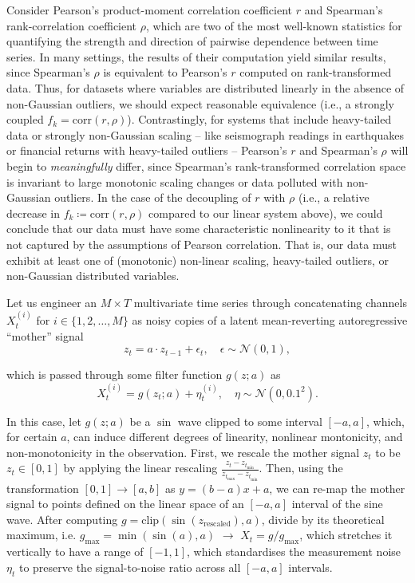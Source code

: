 \documentclass{article}
\theoremstyle{plain}
\theoremstyle{definition}
\theoremstyle{remark}
\begin{document}
Consider Pearson’s product-moment correlation coefficient $r$ and Spearman's rank-correlation coefficient $\rho$, which are two of the most well-known statistics for quantifying the strength and direction of pairwise dependence between time series. In many settings, the results of their computation yield similar results, since Spearman's $\rho$ is equivalent to Pearson’s $r$ computed on rank-transformed data. Thus, for datasets where variables are distributed linearly in the absence of non-Gaussian outliers, we should expect reasonable equivalence (i.e., a strongly coupled $f_k = \mathrm{corr}(r, \rho)$). Contrastingly, for systems that include heavy-tailed data or strongly non-Gaussian scaling -- like seismograph readings in earthquakes or financial returns with heavy-tailed outliers -- Pearson’s $r$ and Spearman’s $\rho$ will begin to \textit{meaningfully} differ, since Spearman’s rank-transformed correlation space is invariant to large monotonic scaling changes or data polluted with non-Gaussian outliers. In the case of the decoupling of $r$ with $\rho$ (i.e., a relative decrease in $f_k \coloneqq \mathrm{corr}(r, \rho)$ compared to our linear system above), we could conclude that our data must have some characteristic nonlinearity to it that is not captured by the assumptions of Pearson correlation. That is, our data must exhibit at least one of (monotonic) non-linear scaling, heavy-tailed outliers, or non-Gaussian distributed variables.

Let us engineer an $M \times T$ multivariate time series through concatenating channels $X_t^{(i)}$ for $i \in \{1,2,\dots,M\}$ as noisy copies of a latent mean-reverting autoregressive “mother” signal
\begin{equation*}
   z_t = a \cdot z_{t-1} + \epsilon_t, \quad \epsilon \sim \mathcal{N}(0,1),
\end{equation*} 

which is passed through some filter function $g(z;a)$ as
\begin{equation*}
    X_t^{(i)} = g(z_t;a) + \eta_t^{(i)}, \quad \eta \sim \mathcal{N}(0,0.1^2).
\end{equation*} 

In this case, let $g(z;a)$ be a $\sin$ wave clipped to some interval $[-a,a]$, which, for certain $a$, can induce different degrees of linearity, nonlinear montonicity, and non-monotonicity in the observation. First, we rescale the mother signal $z_t$ to be $z_t \in [0,1]$ by applying the linear rescaling $\frac{z_t - z_{t_{\min}}}{z_{t_{\max}} - z_{t_{\min}}}$. Then, using the transformation $[0,1] \to [a,b]$ as $y = (b-a)x + a$, we can re-map the mother signal to points defined on the linear space of an $[-a,a]$ interval of the sine wave. After computing $g = \mathrm{clip}(\sin(z_{\mathrm{rescaled}}), a)$, divide by its theoretical maximum, i.e. $g_{\max} = \min(\sin(a), a)$ $\to$ $X_t = g/g_{\max}$, which stretches it vertically to have a range of $[-1,1]$, which standardises the measurement noise $\eta_t$ to preserve the signal-to-noise ratio across all $[-a,a]$ intervals.
\end{document}
